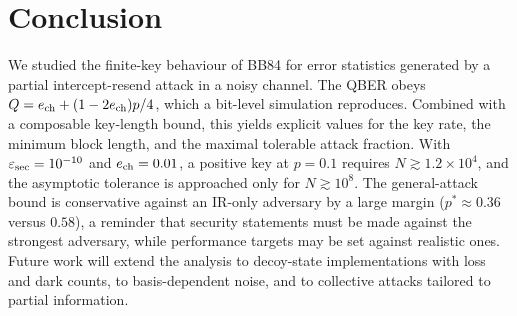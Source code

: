 \section{Conclusion}\label{sec:conclusion}
We studied the finite-key behaviour of BB84 for error statistics generated by a partial intercept-resend attack in a noisy channel. The QBER obeys $Q=e_{\mathrm{ch}}+(1-2e_{\mathrm{ch}})p/4$, which a bit-level simulation reproduces. Combined with a composable key-length bound, this yields explicit values for the key rate, the minimum block length, and the maximal tolerable attack fraction. With $\varepsilon_{\mathrm{sec}}=10^{-10}$ and $e_{\mathrm{ch}}=0.01$, a positive key at $p=0.1$ requires $N\gtrsim1.2\times10^{4}$, and the asymptotic tolerance is approached only for $N\gtrsim10^{8}$. The general-attack bound is conservative against an IR-only adversary by a large margin ($p^\ast\approx0.36$ versus $0.58$), a reminder that security statements must be made against the strongest adversary, while performance targets may be set against realistic ones. Future work will extend the analysis to decoy-state implementations with loss and dark counts, to basis-dependent noise, and to collective attacks tailored to partial information.
